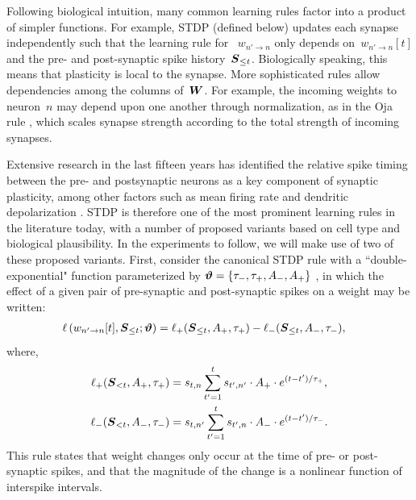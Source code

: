 Following biological intuition, many common learning rules factor into
a product of simpler functions. For example, STDP (defined below)
updates each synapse independently such that the learning rule for 
~$w_{n' \to n}$ only
depends on~${w_{n'\to n}[t]}$ and the pre- and post-synaptic spike
history~${\boldsymbol{S}_{\leq t}}$. Biologically speaking, this means that
plasticity is local to the synapse. More sophisticated rules allow
dependencies among the columns of~$\boldsymbol{W}$. For example, the incoming
weights to neuron~$n$ may depend upon one another through
normalization, as in the Oja rule \cite{Oja-1982}, which scales
synapse strength according to the total strength of incoming synapses.

\sloppy 
Extensive research in the last fifteen years has identified the
relative spike timing between the pre- and postsynaptic neurons as a
key component of synaptic plasticity, among other factors such as mean
firing rate and dendritic depolarization \cite{Feldman-2012}. STDP is
therefore one of the most prominent learning rules in the literature
today, with a number of proposed variants based on cell type and
biological plausibility. In the experiments to follow, we will make
use of two of these proposed variants. First, consider the canonical
STDP rule with a ``double-exponential" function parameterized by
${\boldsymbol{\vartheta} = \{\tau_-, \tau_+, A_-, A_+\}}$ \cite{Song-2000}, in which the
effect of a given pair of pre-synaptic and post-synaptic spikes on a
weight may be written:
\begin{align}
\label{eqn:AddSTDP}
 \ell\left(w_{n' \to n}[t], \boldsymbol{S}_{\leq t}; \boldsymbol{\vartheta} \right) &= 
 \ell_+(\boldsymbol{S}_{\leq t}, A_+, \tau_+) 
 -\ell_-(\boldsymbol{S}_{\leq t}, A_-, \tau_-),
\end{align}
where,
\begin{align*}
\ell_+(\boldsymbol{S}_{<t}, A_+, \tau_+) &= s_{t,n} \sum_{t'=1}^{t} s_{t', n'} \cdot  A_+ \cdot e^{(t-t')/\tau_+}, \\
\ell_-(\boldsymbol{S}_{<t}, A_-, \tau_-) &= s_{t,n'} \sum_{t'=1}^{t} s_{t', n} \cdot  A_- \cdot e^{(t-t')/\tau_-}.
\end{align*}
This rule states that weight changes only occur at the time of pre- or
post-synaptic spikes, and that the magnitude of the change is a
nonlinear function of interspike intervals.

